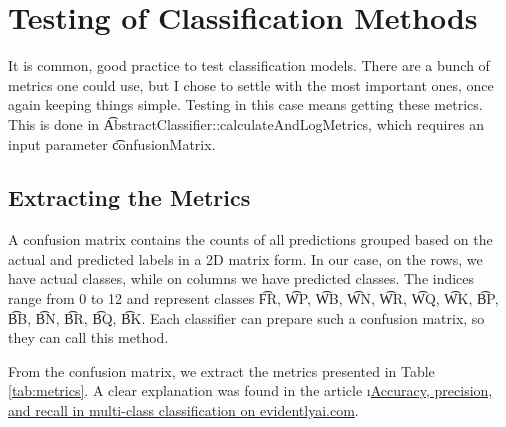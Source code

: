 
\section{Testing of Classification Methods}

It is common, good practice to test classification models. There are a bunch of metrics one could use, but I chose to settle with the most important ones, once again keeping things simple. Testing in this case means getting these metrics. This is done in \t{AbstractClassifier::calculateAndLogMetrics}, which requires an input parameter \t{confusionMatrix}.



\subsection{Extracting the Metrics}

A confusion matrix contains the counts of all predictions grouped based on the actual and predicted labels in a 2D matrix form. In our case, on the rows, we have actual classes, while on columns we have predicted classes. The indices range from 0 to 12 and represent classes \t{FR}, \t{WP}, \t{WB}, \t{WN}, \t{WR}, \t{WQ}, \t{WK}, \t{BP}, \t{BB}, \t{BN}, \t{BR}, \t{BQ}, \t{BK}. Each classifier can prepare such a confusion matrix, so they can call this method.

From the confusion matrix, we extract the metrics presented in Table \ref{tab:metrics}. A clear explanation was found in the article \i{\href{https://www.evidentlyai.com/classification-metrics/multi-class-metrics}{Accuracy, precision, and recall in multi-class classification on evidentlyai.com}}.

